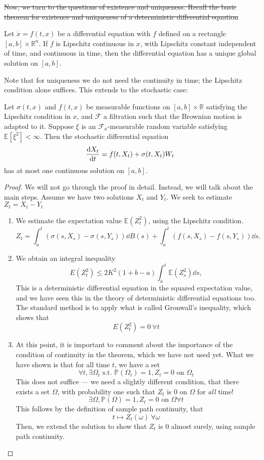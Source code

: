 \documentclass[prb,12pt]{revtex4-2}
\theoremstyle{definition}
\theoremstyle{definition}
\theoremstyle{definition}
\newcommand{\R}{\mathbb{R}}
\begin{document}
	{\color{red} \sout{Now, we turn to the questions of existence and uniqueness. Recall the basic theorem for existence and uniqueness of a deterministic differential equation}}
	\begin{Theorem}
		Let $\dot{x} = f(t,x)$ be a differential equation with $f$ defined on a rectangle $[a,b]\times \R^n$. If $f$ is Lipschitz continuous in $x$, with Lipschitz constant independent of time, and continuous in time, then the differential equation has a unique global solution on $[a,b]$.
	\end{Theorem}
	Note that for uniqueness we do not need the continuity in time; the Lipschitz condition alone suffices. This extends to the stochastic case:
	\begin{Theorem}
		Let $\sigma(t,x)$ and $f(t,x)$ be measurable functions on $[a,b]\times \R$ satisfying the Lipschitz condition in $x$, and $\mathcal{F}$ a filtration such that the Brownian motion is adapted to it. Suppose $\xi$ is an $\mathcal{F}_a$-measurable random variable satisfying $\mathbb{E}[\xi^2]<\infty$. Then the stochastic differential equation
		\[\dv{X_t}{t}=f(t, X_t)+\sigma(t, X_t)W_t\]
		has at most one continuous solution on $[a,b]$.
	\end{Theorem}
	\begin{proof}
		We will not go through the proof in detail. Instead, we will talk about the main steps. Assume we have two solutions $X_t$ and $Y_t$. We seek to estimate $Z_t=X_t-Y_t$
		\begin{enumerate}
			\item We estimate the expectation value $\mathbb{E}(Z_t^2)$, using the Lipschitz condition.
			{\color{red}
					\[Z_t = \int_a^t (\sigma(s, X_s) - \sigma (s, Y_s))\dd{B(s)}+\int_a^t (f(s, X_s) - f(s, Y_s))\dd{s}.\]}
			\item We obtain an integral inequality
			\[
			E(Z_t^2) \le 2K^2 (1+b-a)\int_a^t \mathbb{E}(Z_s^2)\dd{s}
			,\]
			{\color{red} This is a deterministic differential equation in the squared expectation value, and we have seen this in the theory of deterministic differential equations too. The standard method is to apply what is called Gronwall's inequality, which shows that
				\[E(Z_t^2) = 0~\forall t\]}
			\item {\color{red} At this point, it is important to comment about the importance of the condition of continuity in the theorem, which we have not used yet. What we have shown is that for all time $t$, we have a set
				\[\forall t, \exists \Omega_t \text{ s.t. }\mathbb{P}(\Omega_t) = 1, Z_t = 0\text{ on }\Omega_t\]
			This does not suffice --- we need a slightly different condition, that there exists a set $\Omega$, with probability one such that $Z_t$ is 0 on $\Omega$ for \emph{all} time!
			\[\exists \Omega, \mathbb{P}(\Omega) = 1, Z_t=0\text{ on }\Omega \forall t\]
			This follows by the definition of sample path continuity, that
			\[t\mapsto Z_t(\omega)~\forall \omega\]
		}
		 Then, we extend the solution to show that $Z_t$ is $0$ almost surely, using sample path continuity.\qedhere
		\end{enumerate}
	\end{proof}
\end{document}

